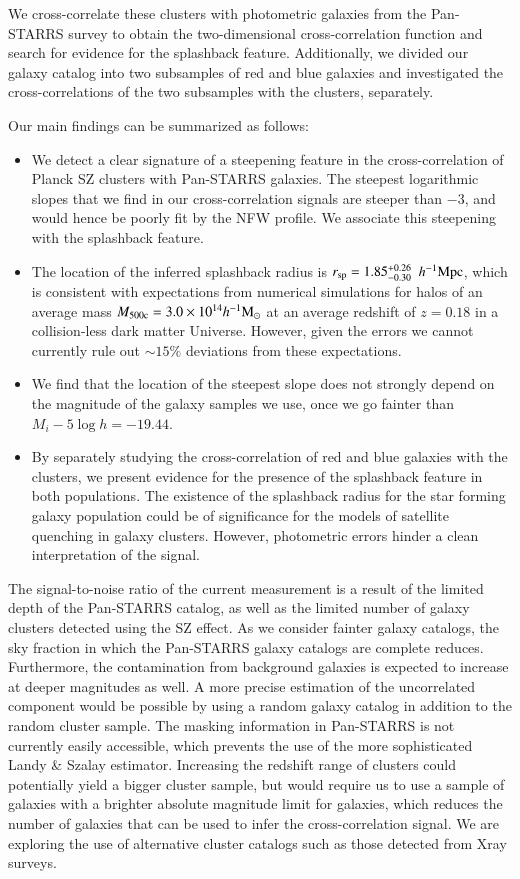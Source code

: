 \documentclass[iop, apjl, twocolappendix, numberedappendix]{emulateapj}
\def\mpch{h^{-1}{\rm Mpc}}
\def\msunh{h^{-1}{\rm M_{\odot}}}
\begin{document}
We cross-correlate these clusters with photometric galaxies from the
Pan-STARRS survey to obtain the two-dimensional cross-correlation
function and search for evidence for the splashback feature.
Additionally, we divided our galaxy catalog into two subsamples of
red and blue galaxies and investigated the cross-correlations of the
two subsamples with the clusters, separately.

Our main findings can be summarized as follows:
\begin{itemize}
\item We detect a clear signature of a steepening feature in the
cross-correlation of Planck SZ clusters with Pan-STARRS
galaxies. The steepest logarithmic slopes that we find in our cross-correlation
signals are steeper than $-3$, and would hence be poorly fit by the
NFW profile. We associate this steepening with the splashback feature.
\item The location of the inferred splashback radius is $r_{\rm
sp}=1.85_{-0.30}^{+0.26}$ $\mpch$, which is consistent with expectations
from numerical simulations for
halos of an average mass $M_{\rm 500c}=3.0\times10^{14}\msunh$ at an
average redshift of $z=0.18$ in a collision-less dark matter Universe.
However, given the errors we cannot
currently rule out $\sim15\%$ deviations from these expectations.
\item We find that the location of the steepest slope does not
strongly depend on the magnitude of the galaxy samples we use, once
we go fainter than $M_i-5\log h=-19.44$.
\item By separately studying the cross-correlation of red and blue
galaxies with the clusters, we present evidence for the presence of
the splashback feature in both populations. The existence of the
splashback radius for the
star forming galaxy population could be of significance for the
models of satellite quenching in galaxy clusters. However, photometric
errors hinder a clean interpretation of the signal.
\end{itemize}

The signal-to-noise ratio of the current measurement is a result of
the limited depth of the Pan-STARRS catalog, as well as the limited
number of galaxy clusters detected using the SZ effect. As we consider
fainter galaxy catalogs, the sky fraction in which the Pan-STARRS
galaxy catalogs are complete reduces. Furthermore, the contamination
from background galaxies is expected to increase at deeper magnitudes
as well. A more precise estimation of the
uncorrelated component would be possible by using a random galaxy
catalog in addition to the random cluster sample. The masking
information in Pan-STARRS is not currently easily accessible, which
prevents the use of the more sophisticated Landy \& Szalay estimator.
Increasing the redshift range of clusters could potentially yield a
bigger cluster sample, but would require us to use a sample of
galaxies with a brighter absolute magnitude limit for galaxies,
which reduces the number of galaxies that can be used to infer the
cross-correlation signal. We are exploring the use of alternative
cluster catalogs such as those detected from Xray surveys.
\end{document}
